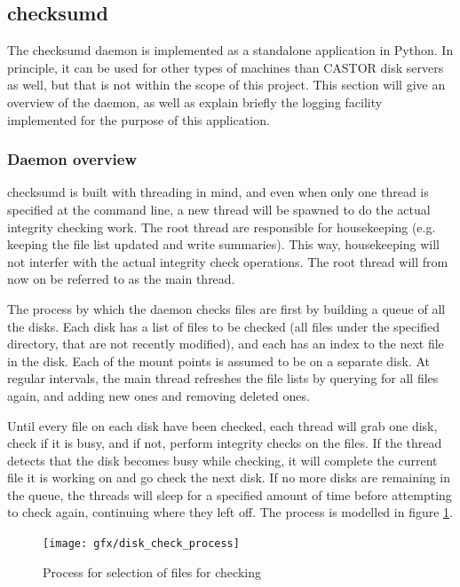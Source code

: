\subsection{checksumd}
The checksumd daemon is implemented as a standalone application in Python. In principle, it can be used for other types of machines than CASTOR disk servers as well, but that is not within the scope of this project. This section will give an overview of the daemon, as well as explain briefly the logging facility implemented for the purpose of this application.

\subsubsection{Daemon overview}
checksumd is built with threading in mind, and even when only one thread is specified at the command line, a new thread will be spawned to do the actual integrity checking work. The root thread are responsible for housekeeping (e.g. keeping the file list updated and write summaries). This way, housekeeping will not interfer with the actual integrity check operations. The root thread will from now on be referred to as the main thread.

The process by which the daemon checks files are first by building a queue of all the disks. Each disk has a list of files to be checked (all files under the specified directory, that are not recently modified), and each has an index to the next file in the disk. Each of the mount points is assumed to be on a separate disk. At regular intervals, the main thread refreshes the file lists by querying for all files again, and adding new ones and removing deleted ones. 

Until every file on each disk have been checked, each thread will grab one disk, check if it is busy, and if not, perform integrity checks on the files. If the thread detects that the disk becomes busy while checking, it will complete the current file it is working on and go check the next disk. If no more disks are remaining in the queue, the threads will sleep for a specified amount of time before attempting to check again, continuing where they left off. The process is modelled in figure \ref{fig:checksum_process}.

\begin{figure}[ht]
\centering
\texttt{[image: gfx/disk\_check\_process]}
\caption{Process for selection of files for checking}
\label{fig:checksum_process}
\end{figure}


